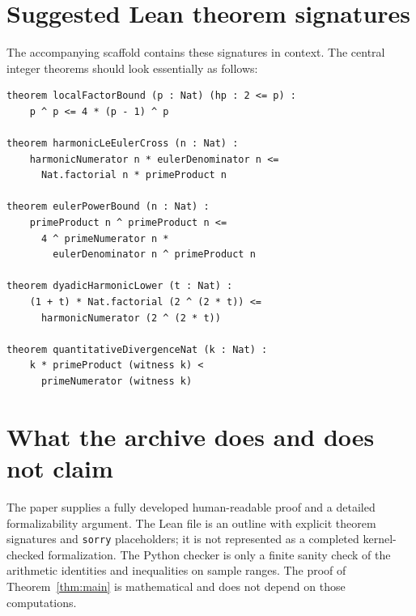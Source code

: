 \documentclass[11pt]{article}
\theoremstyle{definition}
\newcommand{\code}[1]{\texttt{#1}}
\begin{document}
\section{Suggested Lean theorem signatures}

The accompanying scaffold contains these signatures in context.  The central
integer theorems should look essentially as follows:
\begin{lstlisting}
theorem localFactorBound (p : Nat) (hp : 2 <= p) :
    p ^ p <= 4 * (p - 1) ^ p

theorem harmonicLeEulerCross (n : Nat) :
    harmonicNumerator n * eulerDenominator n <=
      Nat.factorial n * primeProduct n

theorem eulerPowerBound (n : Nat) :
    primeProduct n ^ primeProduct n <=
      4 ^ primeNumerator n *
        eulerDenominator n ^ primeProduct n

theorem dyadicHarmonicLower (t : Nat) :
    (1 + t) * Nat.factorial (2 ^ (2 * t)) <=
      harmonicNumerator (2 ^ (2 * t))

theorem quantitativeDivergenceNat (k : Nat) :
    k * primeProduct (witness k) <
      primeNumerator (witness k)
\end{lstlisting}

\section{What the archive does and does not claim}

The paper supplies a fully developed human-readable proof and a detailed
formalizability argument.  The Lean file is an outline with explicit theorem
signatures and \code{sorry} placeholders; it is not represented as a completed
kernel-checked formalization.  The Python checker is only a finite sanity
check of the arithmetic identities and inequalities on sample ranges.  The
proof of Theorem~\ref{thm:main} is mathematical and does not depend on those
computations.
\end{document}
